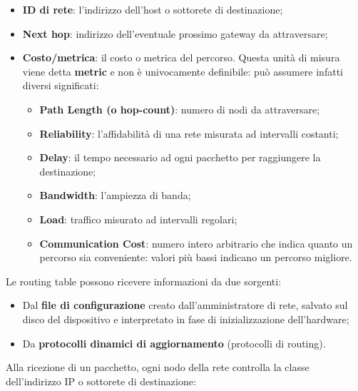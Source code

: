             \begin{itemize}
                \item \textbf{ID di rete}: l’indirizzo dell’host o sottorete di destinazione;
                \item \textbf{Next hop}: indirizzo dell’eventuale prossimo gateway da attraversare;
                \item \textbf{Costo/metrica}: il costo o metrica del percorso. Questa unità di misura viene detta
                \textbf{metric} e non è univocamente definibile: può assumere infatti diversi significati:
                    \begin{itemize}
                        \item \textbf{Path Length (o hop-count)}: numero di nodi da attraversare;
                        \item \textbf{Reliability}: l’affidabilità di una rete misurata ad intervalli costanti;
                        \item \textbf{Delay}: il tempo necessario ad ogni pacchetto per raggiungere la destinazione;
                        \item \textbf{Bandwidth}: l’ampiezza di banda;
                        \item \textbf{Load}: traffico misurato ad intervalli regolari;
                        \item \textbf{Communication Cost}: numero intero arbitrario che indica quanto un percorso
                        sia conveniente: valori più bassi indicano un percorso migliore.
                    \end{itemize}
            \end{itemize}

            Le routing table possono ricevere informazioni da due sorgenti:

            \begin{itemize}
                \item Dal \textbf{file di configurazione} creato dall’amministratore di rete, salvato sul disco del
                dispositivo e interpretato in fase di inizializzazione dell’hardware;
                \item Da \textbf{protocolli dinamici di aggiornamento} (protocolli di routing).
            \end{itemize}

            Alla ricezione di un pacchetto, ogni nodo della rete controlla la classe dell’indirizzo IP o
            sottorete di destinazione:

